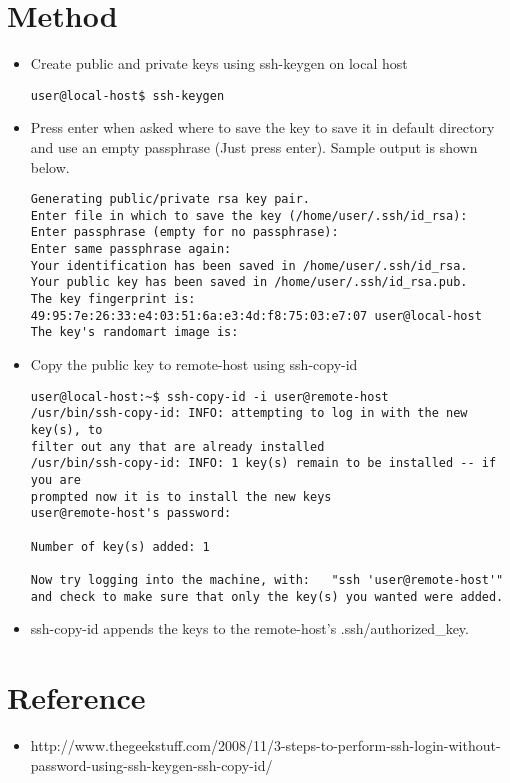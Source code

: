 \documentclass[12pt]{article}
\begin{document}
\section*{Method}
\begin{itemize}
\item Create public and private keys using ssh-keygen on local host

\begin{Verbatim}[frame=single]
user@local-host$ ssh-keygen
\end{Verbatim}

\item Press enter when asked where to save the key to save it in default directory and use an empty passphrase (Just press enter). Sample output is shown below.

\begin{Verbatim}[frame=single]
Generating public/private rsa key pair.
Enter file in which to save the key (/home/user/.ssh/id_rsa): 
Enter passphrase (empty for no passphrase): 
Enter same passphrase again: 
Your identification has been saved in /home/user/.ssh/id_rsa.
Your public key has been saved in /home/user/.ssh/id_rsa.pub.
The key fingerprint is:
49:95:7e:26:33:e4:03:51:6a:e3:4d:f8:75:03:e7:07 user@local-host
The key's randomart image is:
\end{Verbatim}

\item Copy the public key to remote-host using ssh-copy-id

\begin{Verbatim}[frame=single]
user@local-host:~$ ssh-copy-id -i user@remote-host
/usr/bin/ssh-copy-id: INFO: attempting to log in with the new key(s), to
filter out any that are already installed
/usr/bin/ssh-copy-id: INFO: 1 key(s) remain to be installed -- if you are
prompted now it is to install the new keys
user@remote-host's password:

Number of key(s) added: 1

Now try logging into the machine, with:   "ssh 'user@remote-host'"
and check to make sure that only the key(s) you wanted were added.
\end{Verbatim}

\item ssh-copy-id appends the keys to the remote-host's .ssh/authorized\_key.

\end{itemize}

\section*{Reference}
\begin{itemize}
\item http://www.thegeekstuff.com/2008/11/3-steps-to-perform-ssh-login-without-password-using-ssh-keygen-ssh-copy-id/
\end{itemize}
\end{document}
